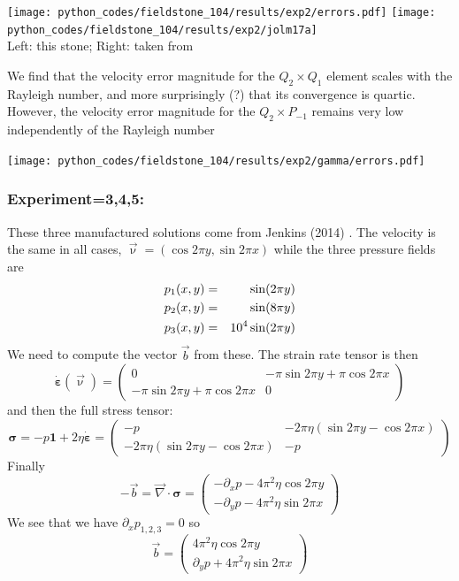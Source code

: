\begin{center}
\texttt{[image: python\_codes/fieldstone\_104/results/exp2/errors.pdf]}
\texttt{[image: python\_codes/fieldstone\_104/results/exp2/jolm17a]}\\
{\captionfont Left: this stone; Right: taken from \cite{jolm17}}
\end{center}

We find that the velocity error magnitude for the $Q_2\times Q_1$ element
scales with the Rayleigh number, and 
more surprisingly (?) that its convergence is quartic.
However, the velocity error magnitude for the $Q_2\times P_{-1}$ 
remains very low independently of the Rayleigh number

\begin{center}
\texttt{[image: python\_codes/fieldstone\_104/results/exp2/gamma/errors.pdf]}
\end{center}

\subsubsection*{Experiment=3,4,5: }

These three manufactured solutions come from Jenkins \etal (2014) \cite{jejl14}.
The velocity is the same in all cases, $\vec{\upnu}=(\cos 2\pi y , \sin 2\pi x)$
while the three pressure fields are
\begin{eqnarray}
p_1(x,y) &=& \sin (2\pi y)  \nonumber\\
p_2(x,y) &=& \sin (8 \pi y)   \nonumber\\
p_3(x,y) &=& 10^4 \sin (2\pi y) \nonumber
\end{eqnarray}
We need to compute the vector $\vec{b}$ from these. 
The strain rate tensor is then 
\[
\dot{\bm \varepsilon}(\vec{\upnu}) = 
\left(
\begin{array}{cc}
0 &  - \pi \sin 2\pi y + \pi \cos 2 \pi x  \\
 - \pi \sin 2\pi y + \pi \cos 2 \pi x   & 0
\end{array}
\right)
\]
and then the full stress tensor:
\[
{\bm \sigma} = 
- p {\bm 1}+ 2 \eta \dot{\bm \varepsilon}
= \left(
\begin{array}{cc}
-p &  -2 \pi \eta (\sin 2\pi y -  \cos 2 \pi x)  \\
-2 \pi \eta (\sin 2\pi y -  \cos 2 \pi x)   & -p
\end{array}
\right)
\]
Finally
\[
-\vec{b} = 
\vec\nabla \cdot {\bm \sigma} = 
\left(
\begin{array}{c}
-\partial_x p - 4 \pi^2 \eta \cos 2\pi y  \\ 
-\partial_y p - 4 \pi^2 \eta \sin 2\pi x 
\end{array}
\right)
\]
We see that we have $\partial_x p_{1,2,3} =0$ so 
\[
\vec{b}
=
\left(
\begin{array}{c}
 4 \pi^2 \eta \cos 2\pi y  \\ 
\partial_y p + 4 \pi^2 \eta \sin 2\pi x 
\end{array}
\right)
\]

